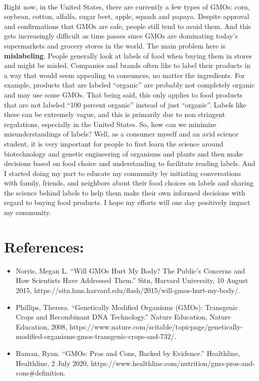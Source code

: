 \documentclass[11pt]{article}
\begin{document}
    \paragraph{}
    Right now, in the United States, there are currently a few types of GMOs: corn, soybean, cotton, alfalfa, sugar beet, apple, squash and papaya.
    Despite approval and confirmations that GMOs are safe, people still tend to avoid them.
    And this gets increasingly difficult as time passes since GMOs are dominating today’s supermarkets and grocery stores in the world.
    The main problem here is \textbf{mislabeling}.
    People generally look at labels of food when buying them in stores and might be misled.
    Companies and brands often like to label their products in a way that would seem appealing to consumers, no matter the ingredients.
    For example, products that are labeled “organic” are probably not completely organic and may use some GMOs. That being said, this only applies to food products that are not labeled “100 percent organic” instead of just “organic”.
    Labels like these can be extremely vague, and this is primarily due to non stringent regulations, especially in the United States.
    So, how can we minimize misunderstandings of labels?
    Well, as a consumer myself and an avid science student, it is very important for people to first learn the science around biotechnology and genetic engineering of organisms and plants and then make decisions based on food choice and understanding to facilitate reading labels.
    And I started doing my part to educate my community by initiating conversations with family, friends, and neighbors about their food choices on labels and sharing the science behind labels to help them make their own informed decisions with regard to buying food products.
    I hope my efforts will one day positively impact my community.

    \newpage

    \section{References:}
    \begin{itemize}
        \item[] Norris, Megan L. “Will GMOs Hurt My Body?
        The Public’s Concerns and How Scientists Have Addressed Them.” Sitn,
        Harvard University, 10 August 2015, https://sitn.hms.harvard.edu/flash/2015/will-gmos-hurt-my-body/.
        \item[] Phillips, Theresa.
        “Genetically Modified Organisms (GMOs): Transgenic Crops and Recombinant DNA Technology.” Nature Education,
        Nature Education, 2008, https://www.nature.com/scitable/topicpage/genetically-modified-organisms-gmos-transgenic-crops-and-732/.
        \item[] Raman, Ryan.
        “GMOs: Pros and Cons, Backed by Evidence.” Healthline, Healthline, 2 July 2020, https://www.healthline.com/nutrition/gmo-pros-and-cons#definition.
    \end{itemize}
\end{document}
